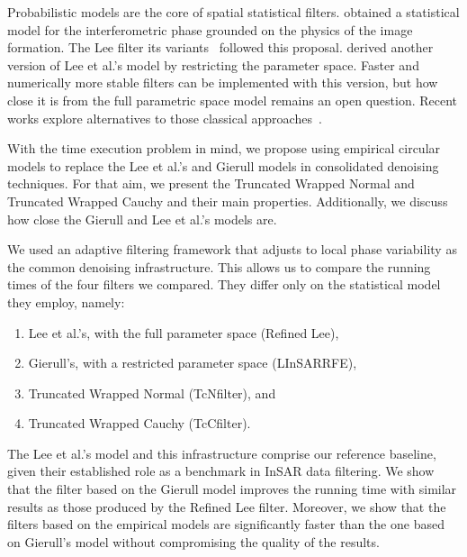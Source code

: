 \documentclass[remotesensing,article,submit,pdftex,moreauthors]{Definitions/mdpi}
\begin{document}
Probabilistic models are the core of spatial statistical filters.
\citet{IntensityAndPhaseStatisticsOfMultilookPolarimetricAndInterferometricSARimagery} obtained a statistical model for the interferometric phase grounded on the physics of the image formation.
The Lee filter its variants~\cite{ImprovedSigmaFilterforSpeckleFilteringofSARImagery, AnewtechniquefornoisefilteringofSARinterferometricphasimages, RefinedFilteringofInterferometricPhaseFromInSARData} followed this proposal. 
\citet{ClosedFormExpressionsforInSARSampleStatisticsandItsApplicationtoNonGaussianData} derived another version of Lee et al.'s model by restricting the parameter space.
Faster and numerically more stable filters can be implemented with this version, but how close it is from the full parametric space model remains an open question.
Recent works explore alternatives to those classical approaches~\citep{AngularConsistencyAdaptiveFilteringandComplexGeneralizedGaussianBasedPhaseLinkingforDSInSAR,CLTCPLaRobustMathematicalFrameworkandAlgorithmforInSARPhaseLinkingUsingtheCentralLimitTheoremofCircularStatistics}.

With the time execution problem in mind, 
we propose using empirical circular models to replace the Lee et al.'s and Gierull models in consolidated denoising techniques.
For that aim, we present the Truncated Wrapped Normal and Truncated Wrapped Cauchy and their main properties.
Additionally, we discuss how close the Gierull and Lee et al.'s models are.

We used 
an adaptive filtering framework that adjusts to local phase variability
as the common denoising infrastructure.
This allows us to compare the running times of the four filters we compared.
They differ only on the statistical model they employ, namely:
\begin{enumerate}[label={\alph*})] 
\item Lee et al.'s, with the full parameter space (Refined Lee),
\item Gierull's, with a restricted parameter space (LInSARRFE),
\item Truncated Wrapped Normal (TcNfilter), and
\item Truncated Wrapped Cauchy (TcCfilter).
\end{enumerate}
The Lee et al.'s model and this infrastructure comprise our reference baseline, given their established role as a benchmark in InSAR data filtering.
We show that the filter based on the Gierull model improves the running time with similar results as those produced by the Refined Lee filter.
Moreover, we show that the filters based on the empirical models are significantly faster than the one based on Gierull's model without compromising the quality of the results.
\end{document}
